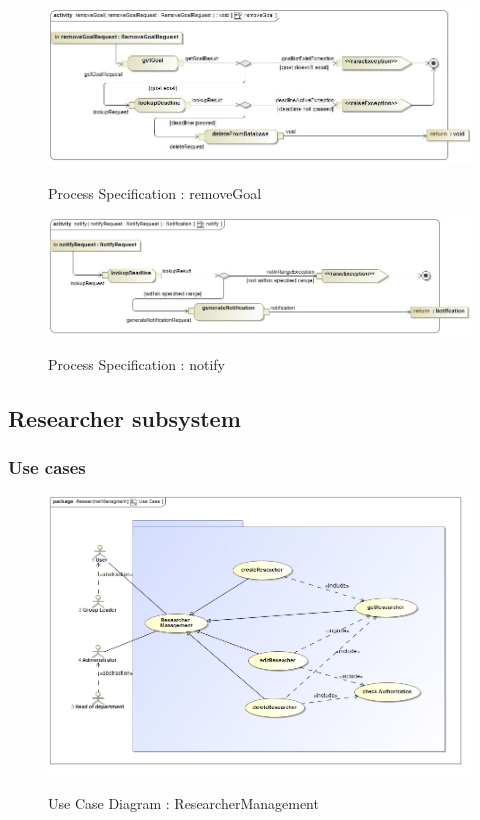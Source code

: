 \documentclass{article}
\begin{document}
  		\begin{figure}[H]
  			\includegraphics[width=\textwidth]{Ruan_Diagrams/removeGoal_processSpecification.jpg}  \\
  			\caption{Process Specification : removeGoal}
  		\end{figure}
  		\begin{figure}[H]
  			\includegraphics[width=\textwidth]{Ruan_Diagrams/notify_processSpecification.jpg}  \\
  			\caption{Process Specification : notify}
  		\end{figure}
	

\subsection{Researcher subsystem}
	\subsubsection{Use cases}
	
		
		\begin{figure}[H]
			\includegraphics[width=\textwidth]{Rohan_Diagrams/UseCase.jpg}  \\
			\caption{Use Case Diagram : ResearcherManagement}
		\end{figure}
\end{document}
